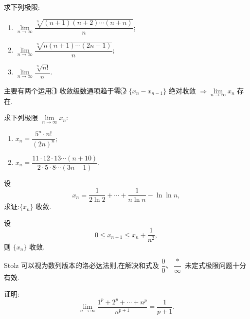 \documentclass[../数学分析培优讲义.tex]{subfiles}
\begin{document}
\begin{example}
求下列极限:
\begin{enumerate}[label=(\arabic*)]
  \item $\displaystyle
  \lim\limits_{n\to\infty}
  \dfrac{\sqrt[n]{(n+1)(n+2)\cdots(n+n)}}{n}$;
  \item $\displaystyle
  \lim\limits_{n\to\infty}
  \dfrac{\sqrt[n]{n(n+1)\cdots(2n-1)}}{n}$;
  \item $\displaystyle
  \lim\limits_{n\to\infty}\dfrac{\sqrt[n]{n!}}{n}$.
\end{enumerate}
\end{example}
\exampleblank


\newpage


主要有两个运用:\textcircled{1} 收敛级数通项趋于零;\textcircled{2}
$\{x_n-x_{n-1}\}$ 绝对收敛 $\Rightarrow \displaystyle \lim\limits_{n\to\infty}x_n$ 存在.

\begin{example}
求下列极限 $\displaystyle \lim\limits_{n\to\infty}x_n$:
\begin{enumerate}[label=(\arabic*)]
  \item $\displaystyle x_n=\dfrac{5^n\cdot n!}{(2n)^n}$;
  \item $\displaystyle x_n=\dfrac{11\cdot12\cdot13\cdots(n+10)}{2\cdot5\cdot8\cdots(3n-1)}$.
\end{enumerate}
\end{example}
\exampleblank

\begin{example}
设
\[
x_n=\dfrac{1}{2\ln2}+\cdots+\dfrac{1}{n\ln n}-\ln\ln n,
\]
求证:$\{x_n\}$ 收敛.
\end{example}
\exampleblank

\begin{example}
设
\[
0\leq x_{n+1}\leq x_n+\dfrac{1}{n^2},
\]
则 $\{x_n\}$ 收敛.
\end{example}
\exampleblank


\newpage


Stolz 可以视为数列版本的洛必达法则,在解决和式及 $\dfrac{0}{0}$、$\dfrac{*}{\infty}$ 未定式极限问题十分有效.

\begin{example}
证明:
\[
\lim\limits_{n\to\infty}
\dfrac{1^p+2^p+\cdots+n^p}{n^{p+1}}
=\dfrac{1}{p+1}.
\]
\end{example}
\exampleblank
\end{document}
